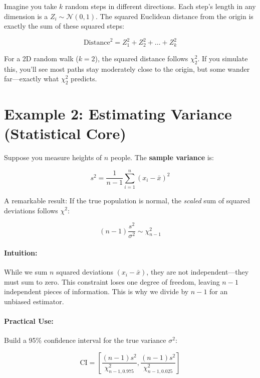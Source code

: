 \documentclass{article}
\begin{document}
Imagine you take $k$ random steps in different directions. Each step's length in any dimension is a $Z_i \sim \mathcal{N}(0,1)$. The squared Euclidean distance from the origin is exactly the sum of these squared steps:

\begin{equation}
    \text{Distance}^2 = Z_1^2 + Z_2^2 + \dots + Z_k^2
\end{equation}

For a 2D random walk ($k=2$), the squared distance follows $\chi^2_2$. If you simulate this, you'll see most paths stay moderately close to the origin, but some wander far—exactly what $\chi^2_2$ predicts.

\section{Example 2: Estimating Variance (Statistical Core)}

Suppose you measure heights of $n$ people. The \textbf{sample variance} is:

\begin{equation}
    s^2 = \frac{1}{n-1}\sum_{i=1}^n (x_i - \bar{x})^2
\end{equation}

A remarkable result: If the true population is normal, the \textit{scaled} sum of squared deviations follows $\chi^2$:

\begin{equation}
    \boxed{(n-1)\frac{s^2}{\sigma^2} \sim \chi^2_{n-1}}
\end{equation}

\paragraph{Intuition:} While we sum $n$ squared deviations $(x_i - \bar{x})$, they are not independent—they must sum to zero. This constraint loses one degree of freedom, leaving $n-1$ independent pieces of information. This is why we divide by $n-1$ for an unbiased estimator.

\paragraph{Practical Use:} Build a 95\% confidence interval for the true variance $\sigma^2$:

\begin{equation}
    \text{CI} = \left[ \frac{(n-1)s^2}{\chi^2_{n-1,0.975}}, \frac{(n-1)s^2}{\chi^2_{n-1,0.025}} \right]
\end{equation}
\end{document}
